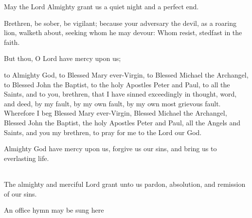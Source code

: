 
May the Lord Almighty grant us a quiet night and a perfect end.\\

Brethren, be sober, be vigilant; because your adversary the devil, as a roaring lion,
walketh about, seeking whom he may devour: Whom resist, stedfast in the faith.

But thou, O Lord have mercy upon us;\\

 to Almighty God, to Blessed Mary ever-Virgin, to Blessed Michael
the Archangel, to Blessed John the Baptist, to the holy Apostles Peter and
Paul, to all the Saints, and to you, brethren, that I have sinned exceedingly in
thought, word, and deed, by my fault, by my own fault, by my own most
grievous fault. Wherefore I beg Blessed Mary ever-Virgin, Blessed Michael
the Archangel, Blessed John the Baptist, the holy Apostles Peter and Paul, all
the Angels and Saints, and you my brethren, to pray for me to the Lord our God.

Almighty God have mercy upon us, forgive us our sins, and bring us to everlasting life.\\

\\
The almighty and merciful Lord grant unto us pardon, absolution, and remission of our sins.\\


\begin{rubric}
An office hymn may be sung here
\end{rubric}

